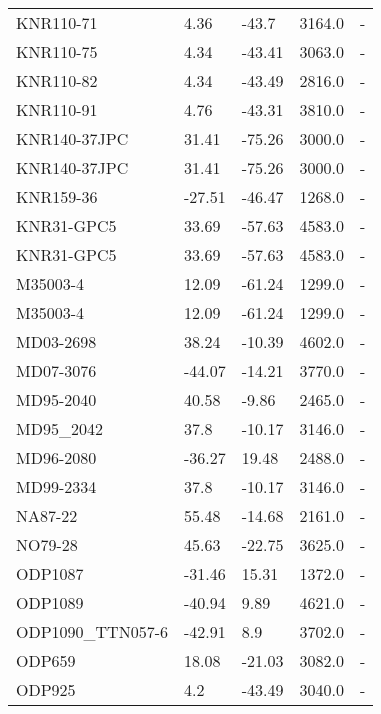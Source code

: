 \begin{longtable}{lllrl}
        KNR110-71 &     4.36 &     -43.7 &     3164.0 &         - \\
        KNR110-75 &     4.34 &    -43.41 &     3063.0 &         - \\
        KNR110-82 &     4.34 &    -43.49 &     2816.0 &         - \\
        KNR110-91 &     4.76 &    -43.31 &     3810.0 &         - \\
     KNR140-37JPC &    31.41 &    -75.26 &     3000.0 &         - \\
     KNR140-37JPC &    31.41 &    -75.26 &     3000.0 &         - \\
        KNR159-36 &   -27.51 &    -46.47 &     1268.0 &         - \\
       KNR31-GPC5 &    33.69 &    -57.63 &     4583.0 &         - \\
       KNR31-GPC5 &    33.69 &    -57.63 &     4583.0 &         - \\
         M35003-4 &    12.09 &    -61.24 &     1299.0 &         - \\
         M35003-4 &    12.09 &    -61.24 &     1299.0 &         - \\
        MD03-2698 &    38.24 &    -10.39 &     4602.0 &         - \\
        MD07-3076 &   -44.07 &    -14.21 &     3770.0 &         - \\
        MD95-2040 &    40.58 &     -9.86 &     2465.0 &         - \\
        MD95\_2042 &     37.8 &    -10.17 &     3146.0 &         - \\
        MD96-2080 &   -36.27 &     19.48 &     2488.0 &         - \\
        MD99-2334 &     37.8 &    -10.17 &     3146.0 &         - \\
          NA87-22 &    55.48 &    -14.68 &     2161.0 &         - \\
          NO79-28 &    45.63 &    -22.75 &     3625.0 &         - \\
          ODP1087 &   -31.46 &     15.31 &     1372.0 &         - \\
          ODP1089 &   -40.94 &      9.89 &     4621.0 &         - \\
 ODP1090\_TTN057-6 &   -42.91 &       8.9 &     3702.0 &         - \\
           ODP659 &    18.08 &    -21.03 &     3082.0 &         - \\
           ODP925 &      4.2 &    -43.49 &     3040.0 &         - \\

\end{longtable}

